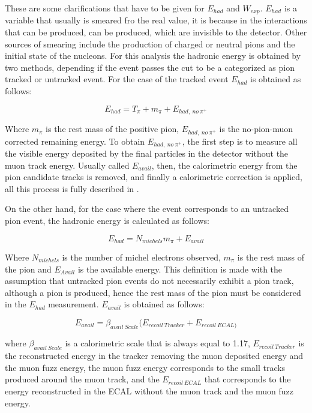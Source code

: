 These are some clarifications that have to be given for $E_{had}$ and $W_{exp}$. $E_{had}$ is a variable that usually is smeared fro the real value, it is because in the interactions that can be produced, can be produced, which are invisible to the detector. Other sources of smearing include the production of charged or neutral pions and the initial state of the nucleons. For this analysis the hadronic energy is obtained by two methods, depending if the event passes the cut to be a categorized as pion tracked or untracked event. For the case of the tracked event $E_{had}$ is obtained as follows:

\begin{equation}
    E_{had} = T_\pi + m_\pi + E_{had,\ no\ \pi^+}
    \label{eq:EhadTracked}
\end{equation}

Where $m_\pi$ is the rest mass of the positive pion, $E_{had,\ no\ \pi^+}$ is the  no-pion-muon corrected remaining energy. To obtain $E_{had,\ no\ \pi^+}$, the first step is to measure all the visible energy deposited by the final particles in the detector without the muon track energy. Usually called $E_{avail}$, then, the calorimetric energy from the pion candidate tracks is removed, and finally a calorimetric correction is applied, all this process is fully described in \cite{AaronThesis}.  

On the other hand, for the case where the event corresponds to an untracked pion event, the hadronic energy is calculated as follows: 

\begin{equation}
    E_{had} = N_{michels}m_\pi + E_{avail}
    \label{eq:EhadUntracked}
\end{equation}

Where $N_{michels}$ is the number of michel electrons observed, $m_\pi$ is the rest mass of the pion and $E_{Avail}$ is the available energy. This definition is made with the assumption that untracked pion events do not necessarily exhibit a pion track, although a pion is produced, hence the rest mass of the pion must be considered in the $E_{had}$ measurement. $E_{avail}$ is obtained as follows: 

\begin{equation}
    E_{avail} = \beta_{avail\ Scale}(E_{recoil\ Tracker} + E_{recoil\ ECAL)}
\end{equation}

where $\beta_{avail\ Scale}$ is a calorimetric scale that is always equal to 1.17, $E_{recoil\ Tracker}$ is the reconstructed energy in the tracker removing the muon deposited energy and the muon fuzz energy, the muon fuzz energy corresponds to the small tracks produced around the muon track, and the $E_{recoil\ ECAL}$ that corresponds to the energy reconstructed in the ECAL without the muon track and the muon fuzz energy.

